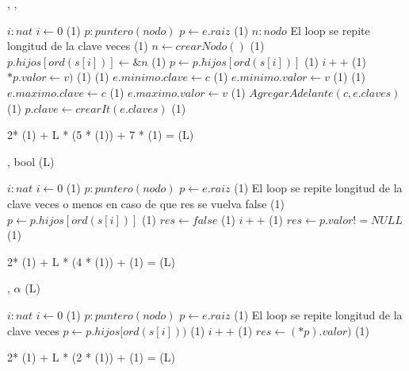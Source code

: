 {   ,
    ,
    }
{}{}
{
	\var $i : nat$
	\State $ i \gets 0$  												\comment \bigo(1) 
	\var $p : puntero(nodo)$ 
	\State $ p \gets e.raiz$											\comment \bigo(1) 
	\var $n : nodo$ 
   		\Statex             \comment El loop se repite longitud de la clave veces
     	                     			\comment \bigo(1)
        \State $n \gets crearNodo()$      							\comment \bigo(1)
        \State $p.hijos[ord(s[i])] \gets \&n$              			\comment \bigo(1)
     	\EndIf
     	\State $p \gets p.hijos[ord(s[i])]$								\comment \bigo(1)
     	\State $i++$   													\comment \bigo(1) 
  \EndWhile		
	\State $*p.valor \gets v)$										\comment \bigo(1)
                       					\comment \bigo(1)
    \State $e.minimo.clave \gets c$     				 	\comment \bigo(1)
    \State $e.minimo.valor \gets v$     				 \comment \bigo(1)
  \EndIf	
                       					\comment \bigo(1)
    \State $e.maximo.clave \gets c$     				 	\comment \bigo(1)
    \State $e.maximo.valor \gets v$     				 	\comment \bigo(1)
  \EndIf
  \State $AgregarAdelante(c, e.claves)$					 \comment \bigo(1)
  \State $p.clave \gets crearIt(e.claves)$        \comment \bigo(1)

}	{  2* \bigo(1) + L * (5 * \bigo(1)) + 7 * \bigo(1) = \bigo(L) }

{   ,
    }
    {bool}
    {\bigo(L)}
{
	\var $i : nat$
	\State $ i \gets 0$  												\comment \bigo(1) 
	\var $p : puntero(nodo)$ 
	\State $ p \gets e.raiz$											\comment \bigo(1)    
	\Statex             \comment El loop se repite longitud de la clave veces o menos en caso de que res se vuelva false
		                      			\comment \bigo(1)
		 	\State $p \gets p.hijos[ord(s[i])]$							\comment \bigo(1)
		 \Else
            \State $res \gets false$  									\comment \bigo(1)
     	 \EndIf	
     	\State $i++$   													\comment \bigo(1) 
    \EndWhile		
	\State $res \gets p.valor != NULL$									\comment \bigo(1)	

}	{  2* \bigo(1) + L * (4 * \bigo(1)) + \bigo(1) = \bigo(L) }


{   ,
    }
    {$\alpha$}
    {\bigo(L)}
{
	\var $i : nat$
	\State $ i \gets 0$  												\comment \bigo(1) 
	\var $p : puntero(nodo)$ 
	\State $ p \gets e.raiz$											\comment \bigo(1)  
     	\Statex             \comment El loop se repite longitud de la clave veces
     	\State $p \gets p.hijos[ord(s[i]))$								\comment \bigo(1)
     	\State $i++$   													\comment \bigo(1) 
    \EndWhile		
	\State $res \gets (*p).valor)$										\comment \bigo(1)												 

}	{  2* \bigo(1) + L * (2 * \bigo(1)) + \bigo(1) = \bigo(L) }

